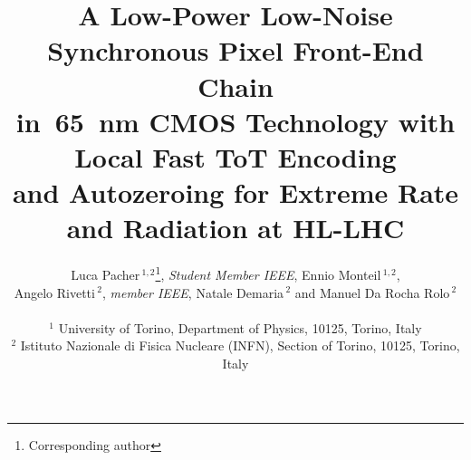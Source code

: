 \documentclass[conference]{./templates/IEEEtran/IEEEtran}
\begin{document}
\date{}

\title{\LARGE {\bf A Low-Power Low-Noise Synchronous Pixel Front-End Chain              \\
                       in~65~nm CMOS Technology with Local Fast ToT Encoding        \\ 
					   and Autozeroing for Extreme Rate and Radiation at HL-LHC} }


                  
\author{Luca Pacher$\,^{1,2}$\footnote{Corresponding author}, \emph{Student Member IEEE}, Ennio Monteil\,$^{1,2}$, \\
        Angelo Rivetti$\,^{2}$, \emph{member IEEE}, Natale Demaria$\,^{2}$ and Manuel Da Rocha Rolo$\,^{2}$        \\

\vspace{1.6mm}	\\	 

\small{$^{1}$ University of Torino, Department of Physics, 10125, Torino, Italy}                        \\[1mm]
\small{$^{2}$ Istituto Nazionale di Fisica Nucleare (INFN), Section of Torino, 10125, Torino, Italy }   \\[2mm]

}%

\maketitle
  
\end{document}
